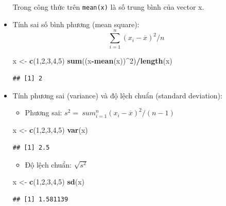 \documentclass[
]{book}
\newenvironment{Shaded}{\begin{snugshade}}{\end{snugshade}}
\newcommand{\DecValTok}[1]{\textcolor[rgb]{0.00,0.00,0.81}{#1}}
\newcommand{\KeywordTok}[1]{\textcolor[rgb]{0.13,0.29,0.53}{\textbf{#1}}}
\newcommand{\NormalTok}[1]{#1}
\newcommand{\OperatorTok}[1]{\textcolor[rgb]{0.81,0.36,0.00}{\textbf{#1}}}
\newcommand{\StringTok}[1]{\textcolor[rgb]{0.31,0.60,0.02}{#1}}
\providecommand{\tightlist}{%
  \setlength{\itemsep}{0pt}\setlength{\parskip}{0pt}}
\begin{document}
\begin{itemize}
  Trong công thức trên \texttt{mean(x)} là số trung bình của vector x.
\item
  Tính sai số bình phương (mean square):
  \[\sum_{i = 1}^{n}\left( x_{i} - \overline{x} \right)^{2}/n\]

\begin{Shaded}
\begin{Highlighting}[]
\NormalTok{x \textless{}{-}}\StringTok{ }\KeywordTok{c}\NormalTok{(}\DecValTok{1}\NormalTok{,}\DecValTok{2}\NormalTok{,}\DecValTok{3}\NormalTok{,}\DecValTok{4}\NormalTok{,}\DecValTok{5}\NormalTok{)}
\KeywordTok{sum}\NormalTok{((x}\OperatorTok{{-}}\KeywordTok{mean}\NormalTok{(x))}\OperatorTok{\^{}}\DecValTok{2}\NormalTok{)}\OperatorTok{/}\KeywordTok{length}\NormalTok{(x)}
\end{Highlighting}
\end{Shaded}

\begin{verbatim}
## [1] 2
\end{verbatim}
\item
  Tính phương sai (variance) và độ lệch chuẩn (standard deviation):

  \begin{itemize}
  \tightlist
  \item
    Phương sai: \(s^{2} = \ sum_{i = 1}^{n}\left( x_{i} - \overline{x} \right)^{2}/(n - 1)\)
  \end{itemize}

\begin{Shaded}
\begin{Highlighting}[]
\NormalTok{x \textless{}{-}}\StringTok{ }\KeywordTok{c}\NormalTok{(}\DecValTok{1}\NormalTok{,}\DecValTok{2}\NormalTok{,}\DecValTok{3}\NormalTok{,}\DecValTok{4}\NormalTok{,}\DecValTok{5}\NormalTok{)}
\KeywordTok{var}\NormalTok{(x)}
\end{Highlighting}
\end{Shaded}

\begin{verbatim}
## [1] 2.5
\end{verbatim}

  \begin{itemize}
  \tightlist
  \item
    Độ lệch chuẩn: \(\sqrt{s^{2}}\)
  \end{itemize}

\begin{Shaded}
\begin{Highlighting}[]
\NormalTok{x \textless{}{-}}\StringTok{ }\KeywordTok{c}\NormalTok{(}\DecValTok{1}\NormalTok{,}\DecValTok{2}\NormalTok{,}\DecValTok{3}\NormalTok{,}\DecValTok{4}\NormalTok{,}\DecValTok{5}\NormalTok{)}
\KeywordTok{sd}\NormalTok{(x)}
\end{Highlighting}
\end{Shaded}

\begin{verbatim}
## [1] 1.581139
\end{verbatim}
\end{itemize}
\end{document}

